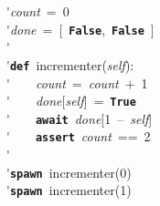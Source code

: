 \'\>\textit{count}~=~0\\

\'\>\textit{done}~=~[~\texttt{\textbf{False}},~\texttt{\textbf{False}}~]\\

\'\>\\

\'\>\texttt{\textbf{def}}~incrementer(\textit{self}):\\

\'\>~~~~\textit{count}~=~\textit{count}~+~1\\

\'\>~~~~\textit{done}[\textit{self}]~=~\texttt{\textbf{True}}\\

\'\>~~~~\texttt{\textbf{await}}~\textit{done}[1~--~\textit{self}]\\

\'\>~~~~\texttt{\textbf{assert}}~\textit{count}~==~2\\

\'\>\\

\'\>\texttt{\textbf{spawn}}~incrementer(0)\\

\'\>\texttt{\textbf{spawn}}~incrementer(1)